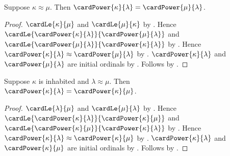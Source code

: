\begin{proposition}\label{cardinal_power_congruent_base}
    Suppose $\kappa\approx\mu$.
    Then $\cardPower{\kappa}{\lambda}
        =\cardPower{\mu}{\lambda}$.
\end{proposition}
\begin{proof}
    $\cardLe{\kappa}{\mu}$ and $\cardLe{\mu}{\kappa}$
        by .
    Hence $\cardLe{\cardPower{\kappa}{\lambda}}
        {\cardPower{\mu}{\lambda}}$ and
        $\cardLe{\cardPower{\mu}{\lambda}}
        {\cardPower{\kappa}{\lambda}}$
        by .
    Hence $\cardPower{\kappa}{\lambda}
        \approx\cardPower{\mu}{\lambda}$
        by .
    $\cardPower{\kappa}{\lambda}$ and
        $\cardPower{\mu}{\lambda}$ are initial ordinals
        by .
    Follows by .
\end{proof}

\begin{proposition}\label{cardinal_power_congruent_exponent}
    Suppose $\kappa$ is inhabited and $\lambda\approx\mu$.
    Then $\cardPower{\kappa}{\lambda}
        =\cardPower{\kappa}{\mu}$.
\end{proposition}
\begin{proof}
    $\cardLe{\lambda}{\mu}$ and $\cardLe{\mu}{\lambda}$
        by .
    Hence $\cardLe{\cardPower{\kappa}{\lambda}}
        {\cardPower{\kappa}{\mu}}$ and
        $\cardLe{\cardPower{\kappa}{\mu}}
        {\cardPower{\kappa}{\lambda}}$
        by .
    Hence $\cardPower{\kappa}{\lambda}
        \approx\cardPower{\kappa}{\mu}$
        by .
    $\cardPower{\kappa}{\lambda}$ and
        $\cardPower{\kappa}{\mu}$ are initial ordinals
        by .
    Follows by .
\end{proof}

